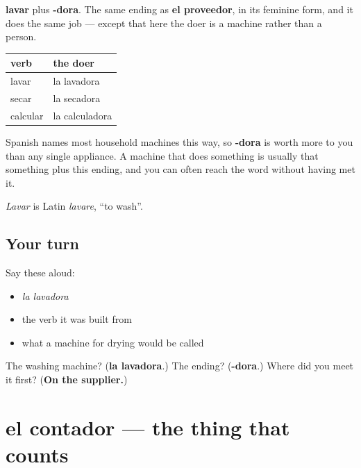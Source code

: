 \begin{cousinweb}
\textbf{lavar} plus \textbf{-dora}. The same ending as \textbf{el proveedor}, in its feminine form, and it does the same job — except that here the doer is a machine rather than a person.

\noindent
\begin{tabularx}{\linewidth}{@{}>{\raggedright\arraybackslash}X>{\raggedright\arraybackslash}X@{}}
\toprule
\textbf{verb} & \textbf{the doer} \\
\midrule
lavar & la lavadora \\
secar & la secadora \\
calcular & la calculadora \\
\bottomrule
\end{tabularx}

Spanish names most household machines this way, so \textbf{-dora} is worth more to you than any single appliance. A machine that does something is usually that something plus this ending, and you can often reach the word without having met it.

\emph{Lavar} is Latin \emph{lavare}, \textquotedblleft{}to wash\textquotedblright{}.
\end{cousinweb}

\subsection*{Your turn}
Say these aloud:

\begin{itemize}
\raggedright
  \item \emph{la lavadora}
  \item the verb it was built from
  \item what a machine for drying would be called
\end{itemize}

\begin{tcolorbox}[breakable,colback=teal!4,colframe=teal!35!black,title={Before you move on}]
The washing machine? (\textbf{la lavadora}.) The ending? (\textbf{-dora}.) Where did you meet it first? (\textbf{On the supplier.})
\end{tcolorbox}
\section[el contador]{el contador — the thing that counts}

\label{lesson:ES-C432-contador}



